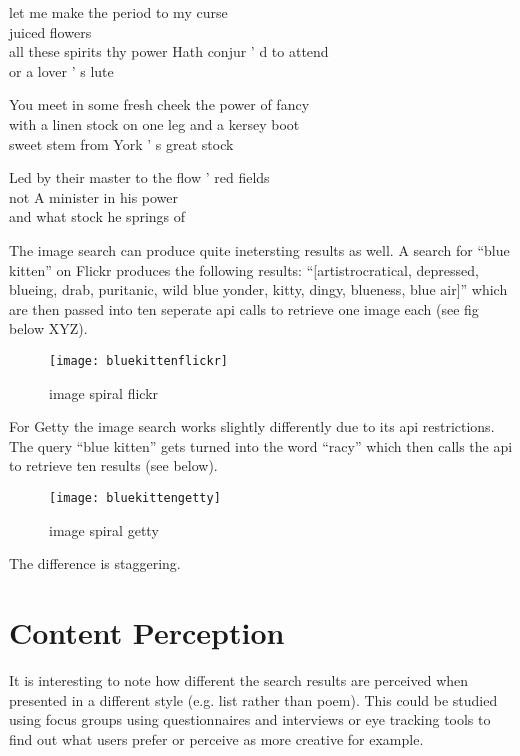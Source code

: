 let me make the period to my curse \\
juiced flowers \\
all these spirits thy power Hath conjur ' d to attend \\
or a lover ' s lute 

You meet in some fresh cheek the power of fancy \\
with a linen stock on one leg and a kersey boot \\
sweet stem from York ' s great stock 

Led by their master to the flow ' red fields \\
not A minister in his power \\
and what stock he springs of







\spirals

The image search can produce quite inetersting results as well. A search for ``blue kitten'' on Flickr produces the following results: ``[artistrocratical, depressed, blueing, drab, puritanic, wild blue yonder, kitty, dingy, blueness, blue air]'' which are then passed into ten seperate \gls{api} calls to retrieve one image each (see fig below XYZ).


\begin{figure}[h!]
\centering
  \texttt{[image: bluekittenflickr]}
\caption[image spiral flickr]{image spiral flickr}
\label{fig:imgspiralflickr}
\end{figure}

For Getty the image search works slightly differently due to its \gls{api} restrictions. The query ``blue kitten'' gets turned into the word ``racy'' which then calls the \gls{api} to retrieve ten results (see below).

\begin{figure}[h!]
\centering
  \texttt{[image: bluekittengetty]}
\caption[image spiral getty]{image spiral getty}
\label{fig:imgspiralgetty}
\end{figure}

The difference is staggering.


\section{Content Perception}

It is interesting to note how different the search results are perceived when presented in a different style (e.g. list rather than poem). This could be studied using focus groups using questionnaires and interviews or eye tracking tools to find out what users prefer or perceive as more creative for example.












